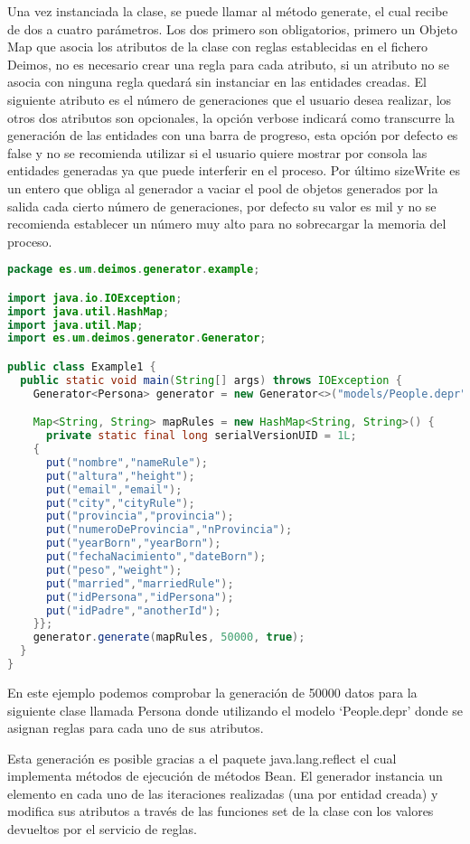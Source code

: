 Una vez instanciada la clase, se puede llamar al método generate, el cual recibe de dos a cuatro parámetros. Los dos primero son obligatorios, primero un Objeto Map que asocia los atributos de la clase con reglas establecidas en el fichero Deimos, no es necesario crear una regla para cada atributo, si un atributo no se asocia con ninguna regla quedará sin instanciar en las entidades creadas. El siguiente atributo es el número de generaciones que el usuario desea realizar, los otros dos atributos son opcionales, la opción verbose indicará como transcurre la generación de las entidades con una barra de progreso, esta opción por defecto es false y no se recomienda utilizar si el usuario quiere mostrar por consola las entidades generadas ya que puede interferir en el proceso. Por último sizeWrite es un entero que obliga al generador a vaciar el pool de objetos generados por la salida cada cierto número de generaciones, por defecto su valor es mil y no se recomienda establecer un número muy alto para no sobrecargar la memoria del proceso.

\begin{lstlisting}[language=java]
package es.um.deimos.generator.example;

import java.io.IOException;
import java.util.HashMap;
import java.util.Map;
import es.um.deimos.generator.Generator;

public class Example1 {
  public static void main(String[] args) throws IOException {
    Generator<Persona> generator = new Generator<>("models/People.depr", Persona.class);

    Map<String, String> mapRules = new HashMap<String, String>() {
      private static final long serialVersionUID = 1L;
    {
      put("nombre","nameRule");
      put("altura","height");
      put("email","email");
      put("city","cityRule");
      put("provincia","provincia");
      put("numeroDeProvincia","nProvincia");
      put("yearBorn","yearBorn");
      put("fechaNacimiento","dateBorn");
      put("peso","weight");
      put("married","marriedRule");
      put("idPersona","idPersona");
      put("idPadre","anotherId");
    }};
    generator.generate(mapRules, 50000, true);
  }
}
\end{lstlisting}

En este ejemplo podemos comprobar la generación de 50000 datos para la siguiente clase llamada Persona donde utilizando el modelo `People.depr' donde se asignan reglas para cada uno de sus atributos.

Esta generación es posible gracias a el paquete java.lang.reflect el cual implementa métodos de ejecución de métodos Bean. El generador instancia un elemento en cada uno de las iteraciones realizadas (una por entidad creada) y modifica sus atributos a través de las funciones set de la clase con los valores devueltos por el servicio de reglas.

